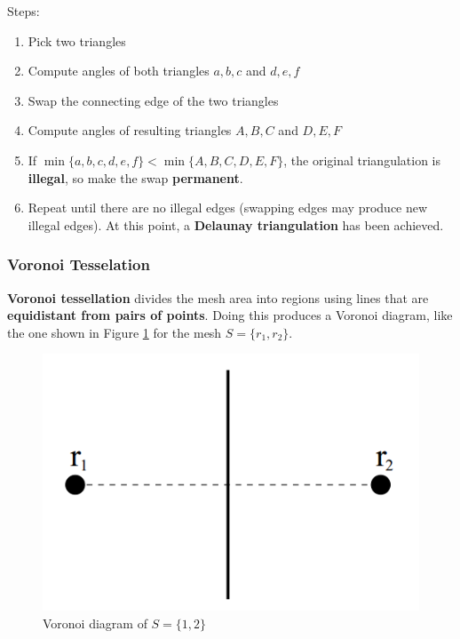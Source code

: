 \documentclass{article}
\begin{document}
Steps:
\begin{enumerate}
	\item Pick two triangles
	\item Compute angles of both triangles $a, b, c$ and $d, e, f$
	\item Swap the connecting edge of the two triangles
	\item Compute angles of resulting triangles $A, B, C$ and $D, E, F$
	\item If $\min \lbrace a, b, c, d, e, f \rbrace < \min \lbrace A, B, C, D, E,F \rbrace$, the original triangulation is \textbf{illegal}, so make the swap \textbf{permanent}.
	\item Repeat until there are no illegal edges (swapping edges may produce new illegal edges). At this point, a \textbf{Delaunay triangulation} has been achieved.
\end{enumerate}

\subsubsection{Voronoi Tesselation}

\textbf{Voronoi tessellation} divides the mesh area into regions using lines that are \textbf{equidistant from pairs of points}. Doing this produces a Voronoi diagram, like the one shown in Figure \ref{fig:voronoi-tesselation} for the mesh $S = \lbrace r_1, r_2 \rbrace$.

\begin{figure}
	\centering
	\includegraphics[scale=0.35]{figures/voronoi-basic-diagram.png}
	\caption{Voronoi diagram of $S = \lbrace 1, 2 \rbrace$}
	\label{fig:voronoi-tesselation}
\end{figure}
\end{document}
